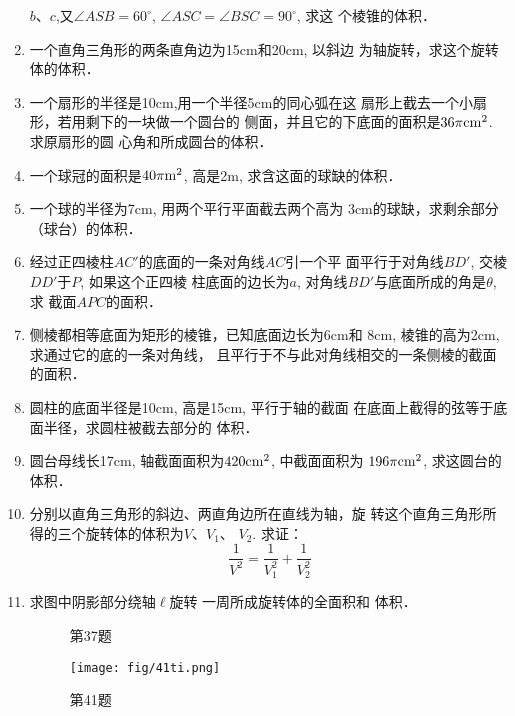 \begin{enumerate}
$b$、$c$,又$\angle ASB=60^{\circ}$, $\angle ASC=\angle BSC=90^{\circ}$, 求这
个棱锥的体积．
\item 一个直角三角形的两条直角边为15cm和20cm, 以斜边
为轴旋转，求这个旋转体的体积．
\item 一个扇形的半径是10cm,用一个半径5cm的同心弧在这
扇形上截去一个小扇形，若用剩下的一块做一个圆台的
侧面，并且它的下底面的面积是$36\pi {\rm cm^2}$. 求原扇形的圆
心角和所成圆台的体积．
\item 一个球冠的面积是$40\pi {\rm m^2}$, 高是2m, 求含这面的球缺的体积．
\item 一个球的半径为7cm, 用两个平行平面截去两个高为
3cm的球缺，求剩余部分（球台）的体积．
\item 经过正四棱柱$AC'$的底面的一条对角线$AC$引一个平
面平行于对角线$BD'$, 交棱$DD'$于$P$, 如果这个正四棱
柱底面的边长为$a$, 对角线$BD'$与底面所成的角是$\theta$, 求
截面$APC$的面积．
\item 侧棱都相等底面为矩形的棱锥，已知底面边长为6cm和
8cm, 棱锥的高为2cm, 求通过它的底的一条对角线，
且平行于不与此对角线相交的一条侧棱的截面的面积．
\item 圆柱的底面半径是10cm, 高是15cm, 平行于轴的截面
在底面上截得的弦等于底面半径，求圆柱被截去部分的
体积．
\item 圆台母线长17cm, 轴截面面积为$420{\rm cm^2}$, 中截面面积为
$196\pi {\rm cm^2}$, 求这圆台的体积．
\item 分别以直角三角形的斜边、两直角边所在直线为轴，旋
转这个直角三角形所得的三个旋转体的体积为$V$、$V_1$、
$V_2$.
求证：
\[\frac{1}{V^2}=\frac{1}{V^2_1}+\frac{1}{V^2_2}\]
\item 求图中阴影部分绕轴$\ell$旋转
一周所成旋转体的全面积和
体积．

\begin{figure}[htp]\centering
    \begin{minipage}[t]{0.48\textwidth}
    \centering
{}
    \caption*{第37题}
    \end{minipage}
    \begin{minipage}[t]{0.48\textwidth}
    \centering
      \texttt{[image: fig/41ti.png]}
    \caption*{第41题}
    \end{minipage}
    \end{figure}


\end{enumerate}
